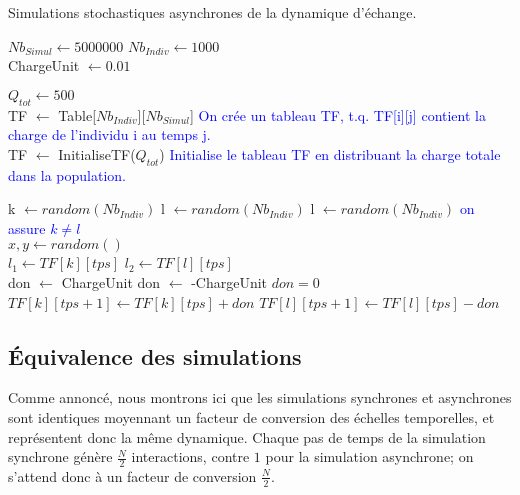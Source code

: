 \clearpage

\begin{algorithm}
\caption{Simulations stochastiques asynchrones de la dynamique d'échange.}
\begin{algorithmic}

\State $Nb_{Simul} \gets 5 000 000$
\State $Nb_{Indiv} \gets 1000$\\

\State ChargeUnit $\gets 0.01$

\State $Q_{tot} \gets 500$\\


\State TF $\gets$ Table[$Nb_{Indiv}$][$Nb_{Simul}$]
\State \textcolor{blue}{On crée un tableau TF, t.q. TF[i][j] contient la charge de l'individu i au temps j.}\\
\State TF $\gets$ InitialiseTF($Q_{tot}$)
\State \textcolor{blue}{Initialise le tableau TF en distribuant la charge totale dans la population.}\\

	
	\State k $\gets random(Nb_{Indiv})$
	\State l $\gets random(Nb_{Indiv})$
		\State l $\gets random(Nb_{Indiv})$
	\EndWhile
	\State \textcolor{blue}{on assure $k \neq l$}\\
		
	\State $x,y \gets random()$\\
		
	\State $l_1 \gets TF[k][tps]$
	\State $l_2 \gets TF[l][tps]$\\
		
		\State don $\gets$ ChargeUnit 
		\State don $\gets$ -ChargeUnit 
	\Else
		\State $don=0$
	\EndIf \\
		
	\State $TF[k][tps+1] \gets TF[k][tps]+don$
    \State $TF[l][tps+1] \gets TF[l][tps]-don$\\
\EndFor



\end{algorithmic}
\end{algorithm}

\subsection{Équivalence des simulations}

Comme annoncé, nous montrons ici que les simulations synchrones et asynchrones sont identiques moyennant un facteur de conversion des échelles temporelles, et représentent donc la même dynamique. Chaque pas de temps de la simulation synchrone génère $\frac{N}{2}$ interactions, contre $1$ pour la simulation asynchrone; on s'attend donc à un facteur de conversion $\frac{N}{2}$.\\

